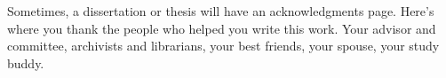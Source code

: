 
\noindent Sometimes, a dissertation or thesis will have an acknowledgments
page. Here's where you thank the people who helped you write this work.
Your advisor and committee, archivists and librarians, your best friends,
your spouse, your study buddy.

